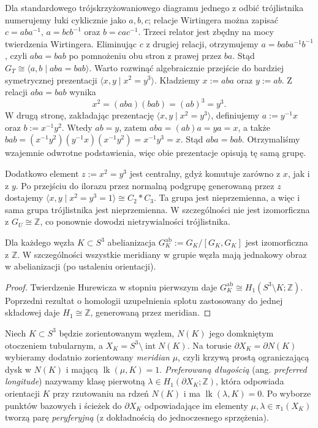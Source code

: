\begin{przyklad}[Trójlistnik]
Dla standardowego trójskrzyżowaniowego diagramu jednego
z odbić trójlistnika numerujemy łuki cyklicznie jako $a,b,c$;
relacje Wirtingera można zapisać
$c=aba^{-1}$, $a=bcb^{-1}$ oraz $b=cac^{-1}$.
Trzeci relator jest zbędny na mocy twierdzenia Wirtingera.
Eliminując $c$ z drugiej relacji, otrzymujemy
$a=baba^{-1}b^{-1}$, czyli $aba=bab$ po pomnożeniu
obu stron z prawej przez $ba$.
Stąd $G_T\cong\langle a,b\mid aba=bab\rangle$.
Warto rozwinąć algebraicznie przejście do bardziej symetrycznej
prezentacji
$\langle x,y\mid x^2=y^3\rangle$.
Kładziemy $x:=aba$ oraz $y:=ab$. Z relacji $aba=bab$ wynika
\[
x^2=(aba)(bab)=(ab)^3=y^3.
\]
W drugą stronę, zakładając prezentację $\langle x,y\mid x^2=y^3\rangle$,
definiujemy
$a:=y^{-1}x$ oraz $b:=x^{-1}y^2$. Wtedy $ab=y$, zatem
$aba=(ab)a=ya=x$, a także
$bab=(x^{-1}y^2)(y^{-1}x)(x^{-1}y^2)=x^{-1}y^3=x$.
Stąd $aba=bab$. Otrzymaliśmy wzajemnie odwrotne podstawienia,
więc obie prezentacje opisują tę samą grupę.

Dodatkowo element $z:=x^2=y^3$ jest centralny, gdyż komutuje
zarówno z $x$, jak i z $y$. Po przejściu do ilorazu przez normalną
podgrupę generowaną przez $z$ dostajemy
$\langle x,y\mid x^2=y^3=1\rangle\cong C_2*C_3$.
Ta grupa jest nieprzemienna, a więc i sama grupa trójlistnika
jest nieprzemienna. W szczególności nie jest izomorficzna z
$G_U\cong\mathbb Z$, co ponownie dowodzi nietrywialności
trójlistnika.
\end{przyklad}

\begin{stwierdzenie}
Dla każdego węzła $K\subset S^3$ abelianizacja
$G_K^{\mathrm{ab}}:=G_K/[G_K,G_K]$ jest izomorficzna z $\mathbb Z$.
W szczególności wszystkie meridiany w grupie węzła mają
jednakowy obraz w abelianizacji (po ustaleniu orientacji).
\end{stwierdzenie}

\begin{proof}
Twierdzenie Hurewicza w stopniu pierwszym daje
$G_K^{\mathrm{ab}}\cong H_1(S^3\setminus K;\mathbb Z)$.
Poprzedni rezultat o homologii uzupełnienia splotu zastosowany
do jednej składowej daje $H_1\cong\mathbb Z$, generowaną
przez meridian.
\end{proof}

\begin{definicja}
\label{def:kt-peripheral}
Niech $K\subset S^3$ będzie zorientowanym węzłem,
$N(K)$ jego domkniętym otoczeniem tubularnym,
a $X_K=S^3\setminus\operatorname{int}N(K)$.
Na torusie $\partial X_K=\partial N(K)$
wybieramy dodatnio zorientowany
\emph{meridian} $\mu$, czyli krzywą prostą
ograniczającą dysk w $N(K)$ i mającą
$\operatorname{lk}(\mu,K)=1$.
\emph{Preferowaną długością} (ang. \emph{preferred
longitude}) nazywamy klasę pierwotną
$\lambda\in H_1(\partial X_K;\mathbb Z)$,
która odpowiada orientacji $K$ przy rzutowaniu
na rdzeń $N(K)$ i ma
$\operatorname{lk}(\lambda,K)=0$.
Po wyborze punktów bazowych i ścieżek
do $\partial X_K$ odpowiadające im
elementy $\mu,\lambda\in\pi_1(X_K)$
tworzą parę \emph{peryferyjną}
(z dokładnością do jednoczesnego sprzężenia).
\end{definicja}

